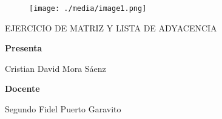 \documentclass[12pt]{article}
\renewcommand{\_}{\kern-1.5pt\textunderscore\kern-1.5pt}
\begin{document}
\vspace{\baselineskip}



\begin{figure}[H]
	\begin{Center}
		\texttt{[image: ./media/image1.png]}
	\end{Center}
\end{figure}



\par

\begin{Center}
EJERCICIO DE MATRIZ Y LISTA DE ADYACENCIA
\end{Center}\par

\begin{Center}
\textbf{Presenta}
\end{Center}\par

\begin{Center}
Cristian David Mora Sáenz
\end{Center}\par

\begin{Center}
 
\end{Center}\par

\begin{Center}
 
\end{Center}\par

\begin{Center}
\textbf{Docente }
\end{Center}\par

\begin{Center}
Segundo Fidel Puerto Garavito
\end{Center}\par

\begin{Center}
 
\end{Center}\par

\begin{Center}
 
\end{Center}\par
\end{document}
